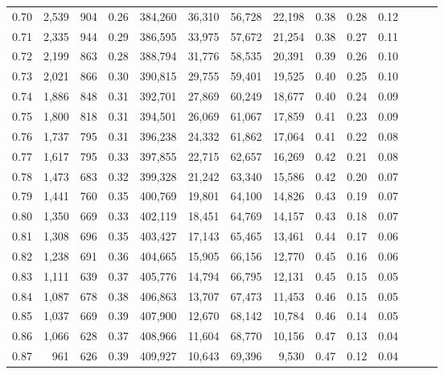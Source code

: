 \begin{tabular}{rrrrrrrrrrrrrr}
0.70 &   2,539 &    904 &  0.26 &  384,260 &   36,310 &  56,728 &  22,198 &  0.38 &  0.28 &      0.12 \\
0.71 &   2,335 &    944 &  0.29 &  386,595 &   33,975 &  57,672 &  21,254 &  0.38 &  0.27 &      0.11 \\
0.72 &   2,199 &    863 &  0.28 &  388,794 &   31,776 &  58,535 &  20,391 &  0.39 &  0.26 &      0.10 \\
0.73 &   2,021 &    866 &  0.30 &  390,815 &   29,755 &  59,401 &  19,525 &  0.40 &  0.25 &      0.10 \\
0.74 &   1,886 &    848 &  0.31 &  392,701 &   27,869 &  60,249 &  18,677 &  0.40 &  0.24 &      0.09 \\
0.75 &   1,800 &    818 &  0.31 &  394,501 &   26,069 &  61,067 &  17,859 &  0.41 &  0.23 &      0.09 \\
0.76 &   1,737 &    795 &  0.31 &  396,238 &   24,332 &  61,862 &  17,064 &  0.41 &  0.22 &      0.08 \\
0.77 &   1,617 &    795 &  0.33 &  397,855 &   22,715 &  62,657 &  16,269 &  0.42 &  0.21 &      0.08 \\
0.78 &   1,473 &    683 &  0.32 &  399,328 &   21,242 &  63,340 &  15,586 &  0.42 &  0.20 &      0.07 \\
0.79 &   1,441 &    760 &  0.35 &  400,769 &   19,801 &  64,100 &  14,826 &  0.43 &  0.19 &      0.07 \\
0.80 &   1,350 &    669 &  0.33 &  402,119 &   18,451 &  64,769 &  14,157 &  0.43 &  0.18 &      0.07 \\
0.81 &   1,308 &    696 &  0.35 &  403,427 &   17,143 &  65,465 &  13,461 &  0.44 &  0.17 &      0.06 \\
0.82 &   1,238 &    691 &  0.36 &  404,665 &   15,905 &  66,156 &  12,770 &  0.45 &  0.16 &      0.06 \\
0.83 &   1,111 &    639 &  0.37 &  405,776 &   14,794 &  66,795 &  12,131 &  0.45 &  0.15 &      0.05 \\
0.84 &   1,087 &    678 &  0.38 &  406,863 &   13,707 &  67,473 &  11,453 &  0.46 &  0.15 &      0.05 \\
0.85 &   1,037 &    669 &  0.39 &  407,900 &   12,670 &  68,142 &  10,784 &  0.46 &  0.14 &      0.05 \\
0.86 &   1,066 &    628 &  0.37 &  408,966 &   11,604 &  68,770 &  10,156 &  0.47 &  0.13 &      0.04 \\
0.87 &     961 &    626 &  0.39 &  409,927 &   10,643 &  69,396 &   9,530 &  0.47 &  0.12 &      0.04 \\

\end{tabular}
